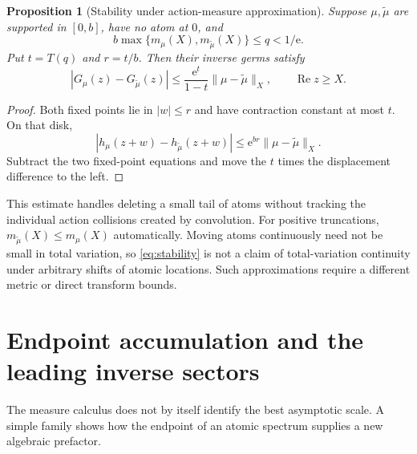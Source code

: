 \documentclass[11pt,a4paper]{article}
\newtheorem{proposition}[theorem]{Proposition}
\theoremstyle{definition}
\theoremstyle{remark}
\newcommand{\e}{\mathrm e}
\newcommand{\Rea}{\operatorname{Re}}
\newcommand{\normx}[2]{\lVert #1\rVert_{#2}}
\numberwithin{equation}{section}
\begin{document}
\begin{proposition}[Stability under action-measure approximation]\label{prop:stability}
Suppose $\mu,\widetilde\mu$ are supported in $[0,b]$, have no atom at $0$, and
\[
 b\max\{m_\mu(X),m_{\widetilde\mu}(X)\}\le q<1/\e.
\]
Put $t=T(q)$ and $r=t/b$. Then their inverse germs satisfy
\begin{equation}\label{eq:stability}
 |G_\mu(z)-G_{\widetilde\mu}(z)|
 \le\frac{\e^t}{1-t}\normx{\mu-\widetilde\mu}{X},
 \qquad \Rea z\ge X.
\end{equation}
\end{proposition}
\begin{proof}
Both fixed points lie in $|w|\le r$ and have contraction constant at most $t$. On that disk,
\[
 |h_\mu(z+w)-h_{\widetilde\mu}(z+w)|
 \le\e^{br}\normx{\mu-\widetilde\mu}{X}.
\]
Subtract the two fixed-point equations and move the $t$ times the displacement difference to the left.
\end{proof}

This estimate handles deleting a small tail of atoms without tracking the individual action collisions created by convolution. For positive truncations, $m_{\widetilde\mu}(X)\le m_\mu(X)$ automatically. Moving atoms continuously need not be small in total variation, so \eqref{eq:stability} is not a claim of total-variation continuity under arbitrary shifts of atomic locations. Such approximations require a different metric or direct transform bounds.

\section{Endpoint accumulation and the leading inverse sectors}\label{sec:endpoint}

The measure calculus does not by itself identify the best asymptotic scale. A simple family shows how the endpoint of an atomic spectrum supplies a new algebraic prefactor.
\end{document}
